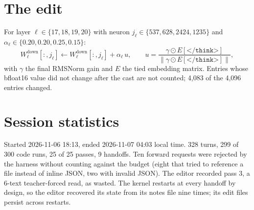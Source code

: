 \documentclass[11pt]{article}
\newcommand{\think}{\texttt{</think>}}
\begin{document}
\appendix
\section{The edit}
For layer $\ell \in \{17, 18, 19, 20\}$ with neuron $j_\ell \in \{537, 628, 2424, 1235\}$ and $\alpha_\ell \in \{0.20, 0.20, 0.25, 0.15\}$:
\[
W^{\mathrm{down}}_{\ell}[:, j_\ell] \leftarrow W^{\mathrm{down}}_{\ell}[:, j_\ell] + \alpha_\ell \, u, \qquad u = \frac{\gamma \odot E[\think]}{\lVert \gamma \odot E[\think] \rVert},
\]
with $\gamma$ the final RMSNorm gain and $E$ the tied embedding matrix. Entries whose bfloat16 value did not change after the cast are not counted; 4,083 of the 4,096 entries changed.

\section{Session statistics}
Started 2026-11-06 18:13, ended 2026-11-07 04:03 local time. 328 turns, 299 of 300 code runs, 25 of 25 passes, 9 handoffs. Ten forward requests were rejected by the harness without counting against the budget (eight that tried to reference a file instead of inline JSON, two with invalid JSON). The editor recorded pass 3, a 6-text teacher-forced read, as wasted. The kernel restarts at every handoff by design, so the editor recovered its state from its notes file nine times; its edit files persist across restarts.
\end{document}
